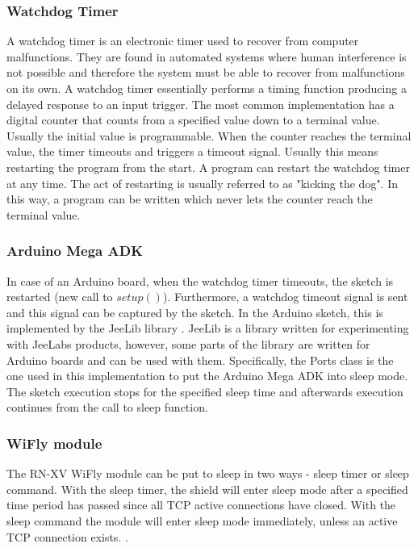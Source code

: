 \subsubsection{Watchdog Timer}
A watchdog timer \cite{watchdog_timer} is an electronic timer used to recover from computer malfunctions. They are found in automated systems where human interference is not possible and therefore the system must be able to recover from malfunctions on its own. 
A watchdog timer essentially performs a timing function producing a delayed response to an input trigger. The most common implementation has a digital counter that counts from a specified value down to a terminal value. Usually the initial value is programmable. When the counter reaches the terminal value, the timer timeouts and triggers a timeout signal. Usually this means restarting the program from the start. A program can restart the watchdog timer at any time. The act of restarting is usually referred to as "kicking the dog". In this way, a program can be written which never lets the counter reach the terminal value.

\subsubsection{Arduino Mega ADK}

In case of an Arduino board, when the watchdog timer timeouts, the sketch is restarted (new call to $setup()$). Furthermore, a watchdog timeout signal is sent and this signal can be captured by the sketch. In the Arduino sketch, this is implemented by the JeeLib library \cite{jeelib_general}. JeeLib is a library written for experimenting with JeeLabs products, however, some parts of the library are written for Arduino boards and can be used with them. Specifically, the Ports class \cite{jeelib_port} is the one used in this implementation to put the Arduino Mega ADK into sleep mode. The sketch execution stops for the specified sleep time and afterwards execution continues from the call to sleep function.


\subsubsection{WiFly module}

The RN-XV WiFly module can be put to sleep in two ways - sleep timer or sleep command. With the sleep timer, the shield will enter sleep mode after a specified time period has passed since all TCP active connections have closed. With the sleep command the module will enter sleep mode immediately, unless an active TCP connection exists. \cite{wifly_manual}. 

